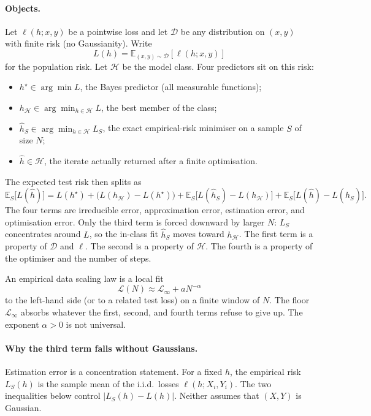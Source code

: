 \documentclass[11pt,a4paper]{article}
\theoremstyle{definition}
\begin{document}
\paragraph{Objects.}
Let \(\ell(h;x,y)\) be a pointwise loss and let \(\mathcal{D}\) be any distribution on \((x,y)\) with finite risk (no Gaussianity). Write
\[
L(h)=\mathbb{E}_{(x,y)\sim\mathcal{D}}[\ell(h;x,y)]
\]
for the population risk. Let \(\mathcal{H}\) be the model class. Four predictors sit on this risk:
\begin{itemize}
    \item \(h^\star\in\arg\min L\), the Bayes predictor (all measurable functions);
    \item \(h_{\mathcal{H}}\in\arg\min_{h\in\mathcal{H}}L\), the best member of the class;
    \item \(\widehat h_S\in\arg\min_{h\in\mathcal{H}}L_S\), the exact empirical-risk minimiser on a sample \(S\) of size \(N\);
    \item \(\widehat h\in\mathcal{H}\), the iterate actually returned after a finite optimisation.
\end{itemize}
The expected test risk then splits as
\[
\mathbb{E}_S\bigl[L(\widehat h)\bigr]
=
L(h^\star)
+\bigl(L(h_{\mathcal{H}})-L(h^\star)\bigr)
+\mathbb{E}_S\bigl[L(\widehat h_S)-L(h_{\mathcal{H}})\bigr]
+\mathbb{E}_S\bigl[L(\widehat h)-L(\widehat h_S)\bigr].
\]
The four terms are irreducible error, approximation error, estimation error, and optimisation error. Only the third term is forced downward by larger \(N\): \(L_S\) concentrates around \(L\), so the in-class fit \(\widehat h_S\) moves toward \(h_{\mathcal{H}}\). The first term is a property of \(\mathcal{D}\) and \(\ell\). The second is a property of \(\mathcal{H}\). The fourth is a property of the optimiser and the number of steps.

An empirical data scaling law is a local fit
\[
\mathcal{L}(N)\approx\mathcal{L}_\infty+aN^{-\alpha}
\]
to the left-hand side (or to a related test loss) on a finite window of \(N\). The floor \(\mathcal{L}_\infty\) absorbs whatever the first, second, and fourth terms refuse to give up. The exponent \(\alpha>0\) is not universal.

\paragraph{Why the third term falls without Gaussians.}
Estimation error is a concentration statement. For a fixed \(h\), the empirical risk \(L_S(h)\) is the sample mean of the i.i.d.\ losses \(\ell(h;X_i,Y_i)\). The two inequalities below control \(\lvert L_S(h)-L(h)\rvert\). Neither assumes that \((X,Y)\) is Gaussian.
\end{document}
